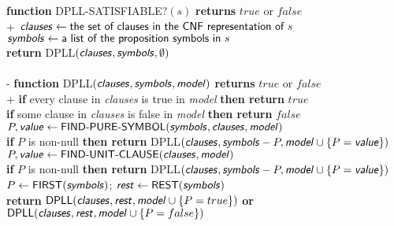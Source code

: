 \documentclass{article}
\begin{document}
\begin{pseudo}
    \textbf{function} DPLL-SATISFIABLE?$(s)$ \textbf{returns} $true$ or $false$\\+
        $\textsf{\emph{clauses}}\leftarrow\textsf{the set of clauses in the CNF representation of }s$\\
        $\textsf{\emph{symbols}}\leftarrow\textsf{a list of the proposition symbols in }s$\\
        \textbf{return} DPLL$(\textsf{\emph{clauses}}, \textsf{\emph{symbols}}, \emptyset)$
    \\\\-
    \textbf{function} DPLL$(\textsf{\emph{clauses}}, \textsf{\emph{symbols}}, \textsf{\emph{model}})$ \textbf{returns} $true$ or $false$\\+
        \textbf{if} every clause in \emph{clauses} is true in \emph{model} \textbf{then return} $true$\\
        \textbf{if} some clause in \emph{clauses} is false in \emph{model} \textbf{then return} $false$\\
        $P,\textsf{\emph{value}}\leftarrow\textsf{FIND-PURE-SYMBOL}(\textsf{\emph{symbols}},\textsf{\emph{clauses}},\textsf{\emph{model}})$\\
        \textbf{if} $P$ is non-null \textbf{then return} DPLL$(\textsf{\emph{clauses}}, \textsf{\emph{symbols}}-P,\textsf{\emph{model}}\cup\{P=\textsf{\emph{value}}\})$\\
        $P,\textsf{\emph{value}}\leftarrow\textsf{FIND-UNIT-CLAUSE}(\textsf{\emph{clauses}}, \textsf{\emph{model}})$\\
        \textbf{if} $P$ is non-null \textbf{then return} DPLL$(\textsf{\emph{clauses}}, \textsf{\emph{symbols}}-P,\textsf{\emph{model}}\cup\{P=\textsf{\emph{value}}\})$\\
        $P\leftarrow\textsf{FIRST}(\textsf{\emph{symbols}})$; $\textsf{\emph{rest}}\leftarrow\textsf{REST}(\textsf{\emph{symbols}})$\\
        \textbf{return} $\textsf{DPLL}(\textsf{\emph{clauses}}, \textsf{\emph{rest}}, \textsf{\emph{model}}\cup\{P=true\})$ \textbf{or}
                        $\textsf{DPLL}(\textsf{\emph{clauses}}, \textsf{\emph{rest}}, \textsf{\emph{model}}\cup\{P=false\})$
\end{pseudo}
\end{document}
